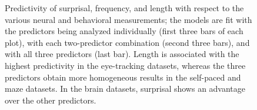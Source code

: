 \begin{figure}[htp]
\begin{center}
{\begin{tikzpicture}
\end{tikzpicture}}
\end{center}
\caption{Predictivity of surprisal, frequency, and length with respect to the various neural and behavioral measurements; the models are fit with the predictors being analyzed individually (first three bars of each plot), with each two-predictor combination (second three bars), and with all three predictors (last bar). Length is associated with the highest predictivity in the eye-tracking datasets, whereas the three predictors obtain more homogeneous results in the self-paced and maze datasets. In the brain datasets, surprisal shows an advantage over the other predictors.}
\label{fig:indep-contrib}

\end{figure}
